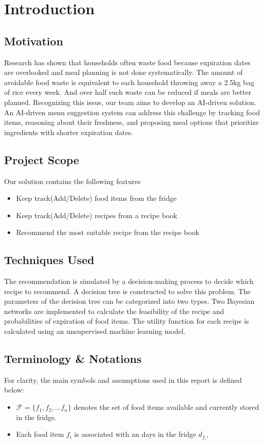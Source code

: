 \section{Introduction}
\subsection{Motivation}
Research has shown that households often waste food because expiration dates are overlooked and meal planning is not done systematically. The amount of avoidable food waste is equivalent to each household throwing away a 2.5kg bag of rice every week. And over half such waste can be reduced if meals are better planned. Recognizing this issue, our team aims to develop an AI-driven solution. An AI-driven menu suggestion system can address this challenge by tracking food items, reasoning about their freshness, and proposing meal options that prioritize ingredients with shorter expiration dates.

\subsection{Project Scope}
Our solution contains the following features
\begin{itemize}
    \item Keep track(Add/Delete) food items from the fridge
    \item Keep track(Add/Delete) recipes from a recipe book
    \item Recommend the most suitable recipe from the recipe book
\end{itemize}

\subsection{Techniques Used}
The recommendation is simulated by a decision-making process to decide which recipe to recommend. A decision tree is constructed to solve this problem. The parameters of the decision tree can be categorized into two types. Two Bayesian networks are implemented to calculate the feasibility of the recipe and probabilities of expiration of food items. The utility function for each recipe is calculated using an unsupervised machine learning model.

\subsection{Terminology \& Notations}

For clarity, the main symbols and assumptions used in this report is defined below:

\begin{itemize}
    \item $\mathcal{F} = \{f_1, f_2, \dots f_n\}$ denotes the set of food items available and currently stored in the fridge.
    \item Each food item $f_i$ is associated with an days in the fridge $d_{f_i}$, 
\end{itemize}
